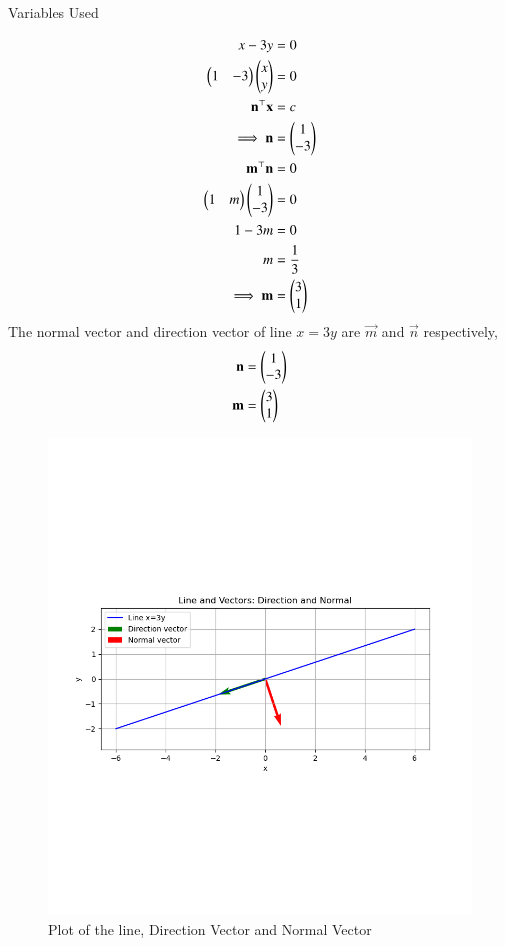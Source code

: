 \documentclass[journal]{IEEEtran}
\begin{document}
\solution
\begin{table}[h!]    
  \centering
  
  \caption{Variables Used}
  \label{tab4.2.10.1}
\end{table}
\begin{align}
    x-3y&=0 \\
    \begin{pmatrix}1 & -3\end{pmatrix}\begin{pmatrix}x \\ y\end{pmatrix}&=0 \\
    \mathbf{n}^\top\mathbf{x}&=c \\
    \implies\mathbf{n}&=\begin{pmatrix}1 \\ -3\end{pmatrix} \\
    \mathbf{m}^\top\mathbf{n}&=0 \\
    \begin{pmatrix}1 & m\end{pmatrix}\begin{pmatrix}1 \\ -3\end{pmatrix}&=0 \\
    1-3m&=0 \\
    m&=\frac{1}{3} \\
    \implies \mathbf{m}&=\begin{pmatrix}3 \\ 1\end{pmatrix}
\end{align}
The normal vector and direction vector of line $x=3y$ are $\vec{m}$ and $\vec{n}$ respectively,
\begin{align}
    \mathbf{n}&=\begin{pmatrix}1 \\ -3\end{pmatrix} \\
    \mathbf{m}&=\begin{pmatrix}3 \\ 1\end{pmatrix}
\end{align}
\begin{figure}[ht!]
	\centering
   	\includegraphics[width=0.8\linewidth]{figs/fig.png}
   	\caption{Plot of the line, Direction Vector and Normal Vector}
\label{Plot}
\end{figure}
\end{document}

